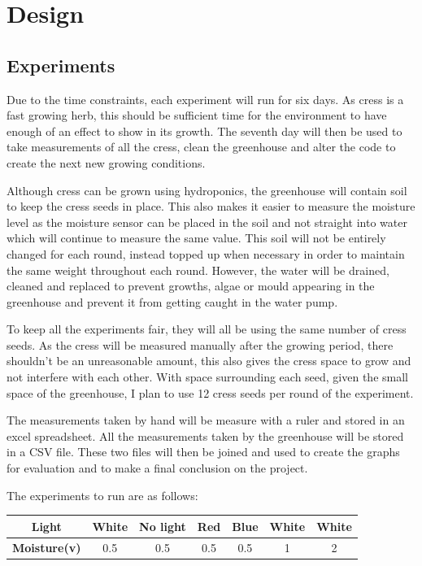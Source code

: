 \chapter{Design}


\section{Experiments}

Due to the time constraints, each experiment will run for six days. As cress is a fast growing herb, this should be sufficient time for the environment to have enough of an effect to show in its growth. The seventh day will then be used to take measurements of all the cress, clean the greenhouse and alter the code to create the next new growing conditions.

Although cress can be grown using hydroponics, the greenhouse will contain soil to keep the cress seeds in place. This also makes it easier to measure the moisture level as the moisture sensor can be placed in the soil and not straight into water which will continue to measure the same value. This soil will not be entirely changed for each round, instead topped up when necessary in order to maintain the same weight throughout each round. However, the water will be drained, cleaned and replaced to prevent growths, algae or mould appearing in the greenhouse and prevent it from getting caught in the water pump.

To keep all the experiments fair, they will all be using the same number of cress seeds. As the cress will be measured manually after the growing period, there shouldn't be an unreasonable amount, this also gives the cress space to grow and not interfere with each other. With space surrounding each seed, given the small space of the greenhouse, I plan to use 12 cress seeds per round of the experiment.

The measurements taken by hand will be measure with a ruler and stored in an excel spreadsheet. All the measurements taken by the greenhouse will be stored in a CSV file. These two files will then be joined and used to create the graphs for evaluation and to make a final conclusion on the project.

The experiments to run are as follows:

\begin{center}
\begin{tabular}{| c | c | c | c | c | c | c |} 
    \hline
    \textbf{Light} & White & No light & Red & Blue & White & White\\
    \hline
    \textbf{Moisture(v)} & 0.5 & 0.5 & 0.5 & 0.5 & 1 & 2\\
    \hline
\end{tabular}
\end{center}

